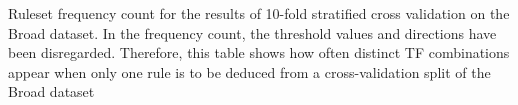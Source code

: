 \begin{table}[h]
    \centering
    
    \caption{Ruleset frequency count for the results of 10-fold stratified cross validation on the Broad dataset.
    In the frequency count, the threshold values and directions have been disregarded.
    Therefore, this table shows how often distinct TF combinations appear when only one rule is to be deduced from a cross-validation split of the Broad dataset}
    \label{tab:threshold_cross_interpretable_mw_0_C_1}
\end{table}
%
%    
%
%    
%
%    
%
%    
%
%    
%
